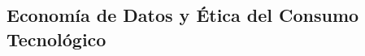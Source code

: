 \begin{refsection}
\chapter{Economía de Datos y Ética del Consumo Tecnológico}
\label{chapter:chapter-11}


\begin{comment}
\begin{enumerate}
\item \textbf{Economía de Datos y Ética del Consumo Tecnológico (Capítulo 11):}  
\begin{itemize}
    \item Análisis de la monetización de datos y desigualdad económica.
    \item Propuestas para distribución ética de beneficios derivados de datos.
    \item Dimensión de explicabilidad: Transparencia en algoritmos de recomendación.
    \item Actividad: Auditar un sistema de recomendación con herramientas de Python.
\end{itemize}
\end{enumerate}
\end{comment}

\nocite{*}

\printbibliography[heading=subbibliography, title={Bibliografía del Capítulo 11}]
\end{refsection}
